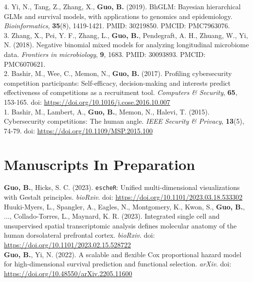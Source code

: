 4. Yi, N., Tang, Z., Zhang, X., {\bf Guo, B.} (2019). BhGLM: Bayesian hierarchical GLMs and survival models, with applications to genomics and epidemiology. {\it Bioinformatics}, {\bf 35}(8), 1419-1421. PMID: 30219850. PMCID: PMC7963076.\\

3. Zhang, X., Pei, Y. F., Zhang, L., {\bf Guo, B.}, Pendegraft, A. H., Zhuang, W., Yi, N. (2018). Negative binomial mixed models for analyzing longitudinal microbiome data. {\it Frontiers in microbiology}, {\bf 9}, 1683. PMID: 30093893. PMCID: PMC6070621.\\

2. Bashir, M., Wee, C., Memon, N., {\bf Guo, B.} (2017). Profiling cybersecurity competition participants: Self-efficacy, decision-making and interests predict effectiveness of competitions as a recruitment tool. {\it Computers \& Security}, {\bf 65}, 153-165. doi: \url{https://doi.org/10.1016/j.cose.2016.10.007}\\

1. Bashir, M., Lambert, A., {\bf Guo, B.}, Memon, N., Halevi, T. (2015). Cybersecurity competitions: The human angle. {\it IEEE Security \& Privacy}, {\bf 13}(5), 74-79. doi: \url{https://doi.org/10.1109/MSP.2015.100}\\

\section{Manuscripts In Preparation}

\vspace{-3ex}

\textbf{Guo, B.}, Hicks, S. C. (2023). \texttt{escheR}: Unified multi-dimensional visualizations with Gestalt principles. {\it bioRxiv}. doi: \url{https://doi.org/10.1101/2023.03.18.533302}\\

Huuki-Myers, L., Spangler, A., Eagles, N., Montgomery, K., Kwon, S., \textbf{Guo, B.}, ..., Collado-Torres, L.,  Maynard, K. R. (2023). Integrated single cell and unsupervised spatial transcriptomic analysis defines molecular anatomy of the human dorsolateral prefrontal cortex. {\it bioRxiv}. doi: \url{https://doi.org/10.1101/2023.02.15.528722}\\

\textbf{Guo, B.}, Yi, N. (2022). A scalable and flexible Cox proportional hazard model for high-dimensional survival prediction and functional selection. {\it arXiv}. doi: \url{https://doi.org/10.48550/arXiv.2205.11600}\\

